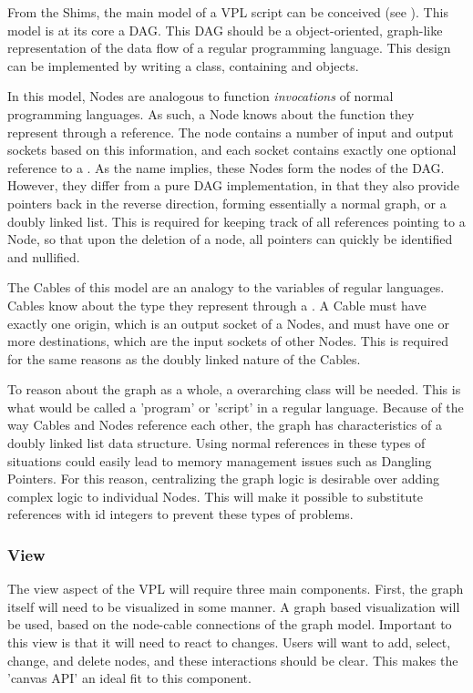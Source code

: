 From the Shims, the main model of a VPL script can be conceived (see ). 
This model is at its core a \ac{DAG}. 
This \ac{DAG} should be a object-oriented, graph-like representation of the data flow of a regular programming language. 
This design can be implemented by writing a  class, containing  and  objects. 

In this model, Nodes are analogous to function \emph{invocations} of normal programming languages. 
As such, a Node knows about the function they represent through a  reference. 
The node contains a number of input and output sockets based on this information, and each socket contains exactly one optional reference to a .  
As the name implies, these Nodes form the nodes of the DAG. 
However, they differ from a pure DAG implementation, in that they also provide pointers back in the reverse direction, forming essentially a normal graph, or a doubly linked list. 
This is required for keeping track of all references pointing to a Node, so that upon the deletion of a node, all pointers can quickly be identified and nullified.

The Cables of this model are an analogy to the variables of regular languages. 
Cables know about the type they represent through a . 
A Cable must have exactly one origin, which is an output socket of a Nodes, 
and must have one or more destinations, which are the input sockets of other Nodes.
This is required for the same reasons as the doubly linked nature of the Cables. 
 
To reason about the graph as a whole, a overarching  class will be needed.
This is what would be called a 'program' or 'script' in a regular language. 
Because of the way Cables and Nodes reference each other, the graph has characteristics of a doubly linked list data structure. 
Using normal references in these types of situations could easily lead to memory management issues such as Dangling Pointers.
For this reason, centralizing the graph logic is desirable over adding complex logic to individual Nodes. 
This will make it possible to substitute references with id integers to prevent these types of problems. 



\subsubsection*{View}

The view aspect of the VPL will require three main components. 
First, the graph itself will need to be visualized in some manner.
A graph based visualization will be used, based on the node-cable connections of the graph model. 
Important to this view is that it will need to react to changes. 
Users will want to add, select, change, and delete nodes, and these interactions should be clear. 
This makes the 'canvas API' an ideal fit to this component.

